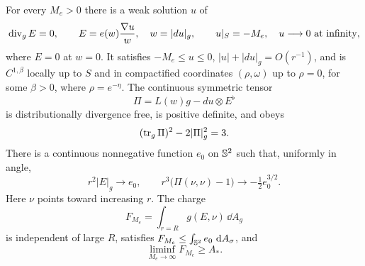 \begin{proposition}
\label{prop:electrostatic-stress}
For every $M_e>0$ there is a weak solution $u$ of
\begin{equation}
 \operatorname{div}_g E=0,\qquad
 E=e(w)\frac{\nabla u}{w},\quad w=|du|_g,
 \qquad u|_S=-M_e,\quad u\longrightarrow0\text{ at infinity},
 \label{eq:stress-electrostatics}
\end{equation}
where $E=0$ at $w=0$.  It satisfies $-M_e\le u\le0$,
$|u|+|du|_g=O(r^{-1})$, and is $C^{1,\beta}$ locally up to $S$ and
in compactified coordinates $(\rho,\omega)$ up to $\rho=0$, for some
$\beta>0$, where $\rho=e^{-\eta}$.
The continuous symmetric tensor
\begin{equation}
 \Pi=L(w)g-du\otimes E^\flat
 \label{eq:stress-tensor}
\end{equation}
is distributionally divergence free, is positive definite, and obeys
\begin{equation}
 (\operatorname{tr}_g\Pi)^2-2|\Pi|_g^2=3.
 \label{eq:stress-algebraic-identity}
\end{equation}
There is a continuous nonnegative function $e_0$ on $\mathbb S^2$ such that,
uniformly in angle,
\begin{equation}
 r^2|E|_g\longrightarrow e_0,\qquad
 r^3\big(\Pi(\nu,\nu)-1\big)
       \longrightarrow-\tfrac12 e_0^{3/2}.
 \label{eq:stress-end-asymptotics}
\end{equation}
Here $\nu$ points toward increasing $r$.  The charge
\begin{equation}
 F_{M_e}=\int_{r=R}g(E,\nu)\,\dd A_g
 \label{eq:stress-charge-definition}
\end{equation}
is independent of large $R$, satisfies
$F_{M_e}\le\int_{\mathbb S^2}e_0\,\mathop{}\!\mathrm d A_\sigma$, and
\begin{equation}
 \liminf_{M_e\to\infty}F_{M_e}\ge A_*.
 \label{eq:stress-charge-saturation}
\end{equation}
\end{proposition}

